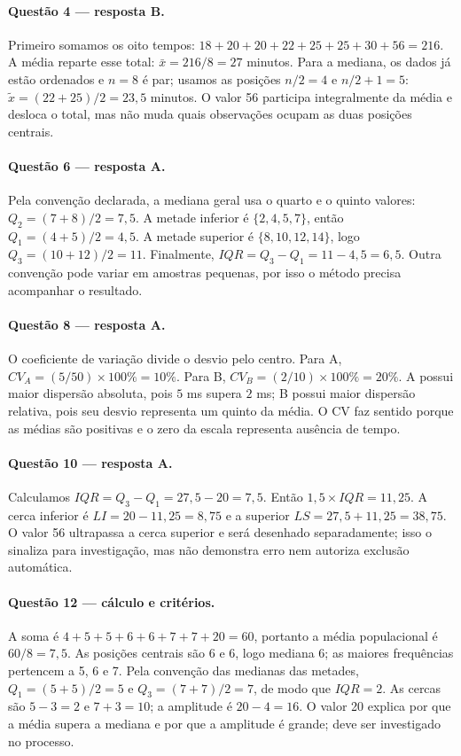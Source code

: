 \paragraph{Questão 4 — resposta B.} Primeiro somamos os oito tempos: $18+20+20+22+25+25+30+56=216$. A média reparte esse total: $\bar x=216/8=27$ minutos. Para a mediana, os dados já estão ordenados e $n=8$ é par; usamos as posições $n/2=4$ e $n/2+1=5$: $\widetilde x=(22+25)/2=23{,}5$ minutos. O valor 56 participa integralmente da média e desloca o total, mas não muda quais observações ocupam as duas posições centrais.

\paragraph{Questão 6 — resposta A.} Pela convenção declarada, a mediana geral usa o quarto e o quinto valores: $Q_2=(7+8)/2=7{,}5$. A metade inferior é $\{2,4,5,7\}$, então $Q_1=(4+5)/2=4{,}5$. A metade superior é $\{8,10,12,14\}$, logo $Q_3=(10+12)/2=11$. Finalmente, $IQR=Q_3-Q_1=11-4{,}5=6{,}5$. Outra convenção pode variar em amostras pequenas, por isso o método precisa acompanhar o resultado.

\paragraph{Questão 8 — resposta A.} O coeficiente de variação divide o desvio pelo centro. Para A, $CV_A=(5/50)\times100\%=10\%$. Para B, $CV_B=(2/10)\times100\%=20\%$. A possui maior dispersão absoluta, pois $5$ ms supera $2$ ms; B possui maior dispersão relativa, pois seu desvio representa um quinto da média. O CV faz sentido porque as médias são positivas e o zero da escala representa ausência de tempo.

\paragraph{Questão 10 — resposta A.} Calculamos $IQR=Q_3-Q_1=27{,}5-20=7{,}5$. Então $1{,}5\times IQR=11{,}25$. A cerca inferior é $LI=20-11{,}25=8{,}75$ e a superior $LS=27{,}5+11{,}25=38{,}75$. O valor 56 ultrapassa a cerca superior e será desenhado separadamente; isso o sinaliza para investigação, mas não demonstra erro nem autoriza exclusão automática.

\paragraph{Questão 12 — cálculo e critérios.} A soma é $4+5+5+6+6+7+7+20=60$, portanto a média populacional é $60/8=7{,}5$. As posições centrais são 6 e 6, logo mediana 6; as maiores frequências pertencem a 5, 6 e 7. Pela convenção das medianas das metades, $Q_1=(5+5)/2=5$ e $Q_3=(7+7)/2=7$, de modo que $IQR=2$. As cercas são $5-3=2$ e $7+3=10$; a amplitude é $20-4=16$. O valor 20 explica por que a média supera a mediana e por que a amplitude é grande; deve ser investigado no processo.

